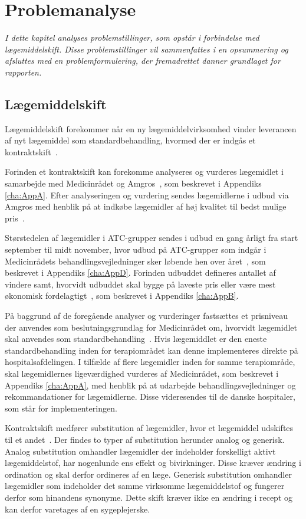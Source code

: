 \chapter{Problemanalyse}
\textit{I dette kapitel analyses problemstillinger, som opstår i forbindelse med lægemiddelskift. Disse problemstillinger vil sammenfattes i en opsummering og afsluttes med en problemformulering, der fremadrettet danner  grundlaget for rapporten.}

\section{Lægemiddelskift}
Lægemiddelskift forekommer når en ny lægemiddelvirksomhed vinder leverancen af nyt lægemiddel som standardbehandling, hvormed der er indgås et kontraktskift~\citep{Amgros2015}. 

Forinden et kontraktskift kan forekomme analyseres og vurderes lægemidlet i samarbejde med Medicinrådet og Amgros~\citep{DanskeRegioner2016}, som beskrevet i Appendiks \ref{cha:AppA}. Efter analyseringen og vurdering sendes lægemidlerne i udbud via Amgros med henblik på at indkøbe lægemidler af høj kvalitet til bedst mulige pris~\citep{Sygehusapoteket2017}.

Størstedelen af lægemidler i ATC-grupper sendes i udbud en gang årligt fra start september til midt november, hvor udbud på ATC-grupper som indgår i Medicinrådets behandlingsvejledninger sker løbende hen over året~\citep{Sygehusapoteket2017}, som beskrevet i Appendiks \ref{cha:AppD}.
Forinden udbuddet defineres antallet af vindere samt, hvorvidt udbuddet skal bygge på laveste pris eller være mest økonomisk fordelagtigt~\citep{Amgros2018a}, som beskrevet i Appendiks \ref{cha:AppB}.

På baggrund af de foregående analyser og vurderinger fastsættes et prisniveau der anvendes som beslutningsgrundlag for Medicinrådet om, hvorvidt lægemidlet skal anvendes som standardbehandling~\citep{DanskeRegioner2016}. Hvis lægemiddlet er den eneste standardbehandling inden for terapiområdet kan denne implementeres direkte på hospitalsafdelingen. I tilfælde af flere lægemidler inden for samme terapiområde, skal lægemidlernes ligeværdighed vurderes af Medicinrådet, som beskrevet i Appendiks \ref{cha:AppA}, med henblik på at udarbejde behandlingsvejledninger og rekommandationer for lægemidlerne. Disse videresendes til de danske hospitaler, som står for implementeringen.~\citep{DanskeRegioner2016}

Kontraktskift medfører substitution af lægemidler, hvor et lægemiddel udskiftes til et andet~\citep{DanskSelskabforPatientsikkerhed2009}. Der findes to typer af substitution herunder analog og generisk.
Analog substitution omhandler lægemidler der indeholder forskelligt aktivt lægemiddelstof, har nogenlunde ens effekt og bivirkninger. Disse kræver ændring i ordination og skal derfor ordineres af en læge. Generisk substitution omhandler lægemidler som indeholder det samme virksomme lægemiddelstof og fungerer derfor som hinandens synonyme. Dette skift kræver ikke en ændring i recept og kan derfor varetages af en sygeplejerske.~\citep{DanskSelskabforPatientsikkerhed2009}

